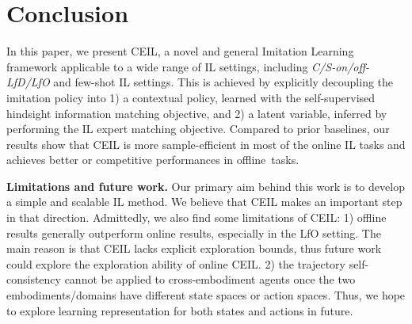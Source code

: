 \vspace{-2pt}
\section{Conclusion}
\vspace{-3pt}

In this paper, we present CEIL, a novel and general Imitation Learning framework applicable to a wide range of IL settings, including \textit{C/S-on/off-LfD/LfO} and few-shot IL settings. 
This is achieved by explicitly decoupling the imitation policy into 1) a contextual policy, learned with the self-supervised hindsight information matching objective, and 2) a latent variable, inferred by performing the IL expert matching objective. 
Compared to prior baselines, our results show that CEIL is more sample-efficient in most of the online IL tasks and achieves better or competitive performances in offline~tasks.  





\textbf{Limitations and future work.} 
Our primary aim behind this work is to develop a simple and scalable IL method. We believe that CEIL makes an important step in that direction. Admittedly, we also find some limitations of CEIL: 1) offline results generally outperform online results, especially in the LfO setting. The main reason is that CEIL lacks explicit exploration bounds, thus future work could explore the exploration ability of online CEIL. 
2) the trajectory self-consistency cannot be applied to cross-embodiment agents once the two embodiments/domains have different state spaces or action spaces. Thus, we hope to explore learning representation for both states and actions in future. 







